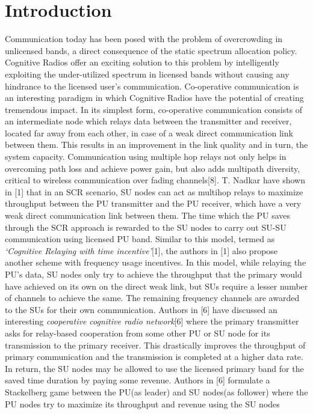 \documentclass[conference]{IEEEtran}
\begin{document}
\section{Introduction}
Communication today has been posed with the problem of overcrowding in unlicensed bands, a direct consequence of the static spectrum allocation policy. Cognitive Radios offer an exciting 
solution to this problem by intelligently exploiting the under-utilized spectrum in licensed bands without causing any hindrance to
the licensed user’s communication. Co-operative communication is an interesting paradigm in which Cognitive Radios have the potential of creating tremendous 
impact. In its simplest form, co-operative communication consists of an intermediate node which relays data between 
the transmitter and receiver, located far away from each other, in case of a weak direct communication link between them. This results in an improvement in the link quality and in turn, the 
system capacity. Communication using multiple hop relays not only helps in overcoming path loss and achieve power gain, but 
also adds multipath diversity, critical to wireless communication over fading channels[8]. T. Nadkar 
have shown in [1] that in an SCR scenario, SU nodes can act as multihop
relays to maximize throughput between the PU transmitter and the PU receiver, which have a very weak direct communication link between them. The time which the PU saves through the 
SCR approach is rewarded to the SU nodes to carry out SU-SU communication using
licensed PU band. Similar to this model, termed as \textit{`Cognitive Relaying with time incentive'}[1], the authors in [1] also propose another 
scheme with frequency usage incentives. In this model, while relaying the PU's data, SU nodes only try to achieve the throughput that the primary would have 
achieved on its own on the direct weak link, but SUs require a lesser number of channels to achieve the same. The remaining frequency channels are awarded to the SUs for their own 
communication. Authors in [6] have discussed an interesting \textit{cooperative cognitive radio network}[6] 
where the primary transmitter asks for relay-based cooperation from some other PU or SU node for its transmission to the primary 
receiver. This drastically improves the throughput of primary communication and the transmission is completed at a higher data rate.
In return, the SU nodes may be allowed to use the licensed primary band for the saved time duration by paying some revenue. 
Authors in [6] formulate a Stackelberg game between the PU(as leader) and SU nodes(as follower) where the PU nodes try to maximize its throughput and revenue using the SU nodes 
\end{document}
